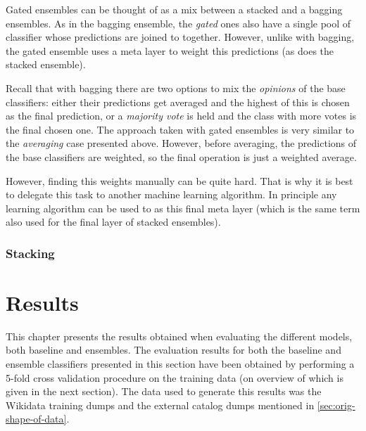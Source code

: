 \documentclass[epsfig,a4paper,11pt,titlepage,twoside,openany]{book}
\begin{document}
Gated ensembles can be thought of as a mix between a stacked and a bagging ensembles. As in the bagging ensemble, the \textit{gated} ones also have a single pool of classifier whose predictions are joined to together. However, unlike with bagging, the gated ensemble uses a meta layer to weight this predictions (as does the stacked ensemble).

Recall that with bagging there are two options to mix the \textit{opinions} of the base classifiers: either their predictions get averaged and the highest of this is chosen as the final prediction, or a \textit{majority vote} is held and the class with more votes is the final chosen one. The approach taken with gated ensembles is very similar to the \textit{averaging} case presented above. However, before averaging, the predictions of the base classifiers are weighted, so the final operation is just a weighted average.

However, finding this weights manually can be quite hard. That is why it is best to delegate this task to another machine learning algorithm. In principle any learning algorithm can be used to as this final meta layer (which is the same term also used for the final layer of stacked ensembles). 



\subsection{Stacking}
\label{sec:ens-stacking}



\chapter{Results}
\label{chap:results}

This chapter presents the results obtained when evaluating the different models, both baseline and ensembles. The evaluation results for both the baseline and ensemble classifiers presented in this section have been obtained by performing a 5-fold cross validation procedure on the training data (on overview of which is given in the next section). The data used to generate this results was the Wikidata training dumps and the external catalog dumps mentioned in \autoref{sec:orig-shape-of-data}.
\end{document}
